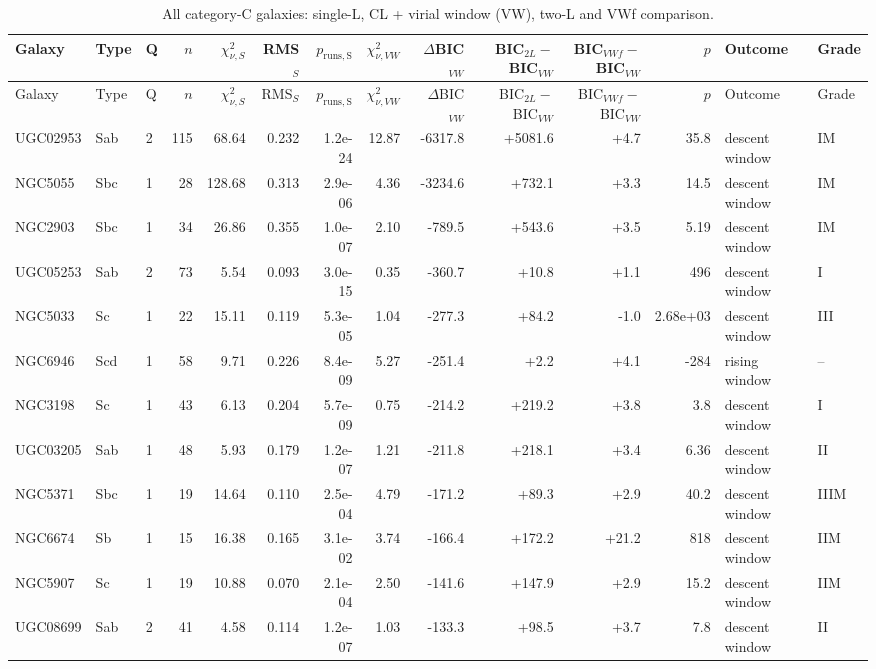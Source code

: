 \documentclass[10pt]{article}
\begin{document}
\clearpage\begin{landscape}{\scriptsize\setlength{\tabcolsep}{3pt}
\begin{longtable}{lllrrrrrrrrrll}
\caption{All category-C galaxies: single-L, CL + virial window (VW), two-L and VWf comparison.}\\\toprule
Galaxy & Type & Q & $n$ & $\chi^2_{\nu,S}$ & RMS$_S$ & $p_\mathrm{runs,S}$ & $\chi^2_{\nu,VW}$ & $\Delta$BIC$_{VW}$ & BIC$_{2L}-$BIC$_{VW}$ & BIC$_{VWf}-$BIC$_{VW}$ & $p$ & Outcome & Grade\\\midrule\endfirsthead
\toprule Galaxy & Type & Q & $n$ & $\chi^2_{\nu,S}$ & RMS$_S$ & $p_\mathrm{runs,S}$ & $\chi^2_{\nu,VW}$ & $\Delta$BIC$_{VW}$ & BIC$_{2L}-$BIC$_{VW}$ & BIC$_{VWf}-$BIC$_{VW}$ & $p$ & Outcome & Grade\\\midrule\endhead\bottomrule\endfoot
UGC02953 & Sab & 2 & 115 & 68.64 & 0.232 & 1.2e-24 & 12.87 & -6317.8 & +5081.6 & +4.7 & 35.8 & descent window & IM\\
NGC5055 & Sbc & 1 & 28 & 128.68 & 0.313 & 2.9e-06 & 4.36 & -3234.6 & +732.1 & +3.3 & 14.5 & descent window & IM\\
NGC2903 & Sbc & 1 & 34 & 26.86 & 0.355 & 1.0e-07 & 2.10 & -789.5 & +543.6 & +3.5 & 5.19 & descent window & IM\\
UGC05253 & Sab & 2 & 73 & 5.54 & 0.093 & 3.0e-15 & 0.35 & -360.7 & +10.8 & +1.1 & 496 & descent window & I\\
NGC5033 & Sc & 1 & 22 & 15.11 & 0.119 & 5.3e-05 & 1.04 & -277.3 & +84.2 & -1.0 & 2.68e+03 & descent window & III\\
NGC6946 & Scd & 1 & 58 & 9.71 & 0.226 & 8.4e-09 & 5.27 & -251.4 & +2.2 & +4.1 & -284 & rising window & --\\
NGC3198 & Sc & 1 & 43 & 6.13 & 0.204 & 5.7e-09 & 0.75 & -214.2 & +219.2 & +3.8 & 3.8 & descent window & I\\
UGC03205 & Sab & 1 & 48 & 5.93 & 0.179 & 1.2e-07 & 1.21 & -211.8 & +218.1 & +3.4 & 6.36 & descent window & II\\
NGC5371 & Sbc & 1 & 19 & 14.64 & 0.110 & 2.5e-04 & 4.79 & -171.2 & +89.3 & +2.9 & 40.2 & descent window & IIIM\\
NGC6674 & Sb & 1 & 15 & 16.38 & 0.165 & 3.1e-02 & 3.74 & -166.4 & +172.2 & +21.2 & 818 & descent window & IIM\\
NGC5907 & Sc & 1 & 19 & 10.88 & 0.070 & 2.1e-04 & 2.50 & -141.6 & +147.9 & +2.9 & 15.2 & descent window & IIM\\
UGC08699 & Sab & 2 & 41 & 4.58 & 0.114 & 1.2e-07 & 1.03 & -133.3 & +98.5 & +3.7 & 7.8 & descent window & II\\

\end{longtable}}
\end{landscape}
\end{document}
